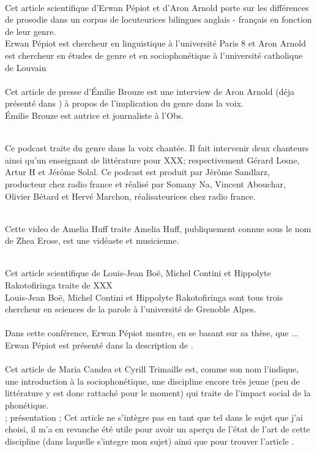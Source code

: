 \cite{Pep20} \\
      Cet article scientifique d'Erwan Pépiot et d'Aron Arnold porte sur les différences de prosodie dans un corpus de locuteurices bilingues anglais - français en fonction de leur genre.\\
      Erwan Pépiot est chercheur en linguistique à l'université Paris 8 et Aron Arnold est chercheur en études de genre et en sociophonétique à l'université catholique de Louvain \\

\cite{Bro18} \\
      Cet article de presse d'Émilie Brouze est une interview de Aron Arnold (déja présenté dans \cite{Pep20}) à propos de l'implication du genre dans la voix.\\
      Émilie Brouze est autrice et journaliste à l'Obs.

\cite{podcast} \\
      Ce podcast traite du genre dans la voix chantée. Il fait intervenir deux chanteurs ainsi qu'un enseignant de littérature pour XXX; respectivement Gérard Lesne, Artur H et Jérôme Solal.
      Ce podcast est produit par Jérôme Sandlarz, producteur chez radio france et réalisé par Somany Na, Vincent Abouchar, Olivier Bétard et Hervé Marchon, réalisateurices chez radio france.

\cite{video} \\
      Cette video de Amelia Huff traite 
      Amelia Huff, publiquement connue sous le nom de Zhea Erose, est une vidéaste et musicienne.

\cite{Boe75} \\
      Cet article scientifique de Louis-Jean Boë, Michel Contini et Hippolyte Rakotofiringa traite de XXX\\
      Louis-Jean Boë, Michel Contini et Hippolyte Rakotofiringa sont tous trois chercheur en sciences de la parole à l'université de Grenoble Alpes.\\

\cite{Pep16} \\
      Dans cette conférence, Erwan Pépiot montre, en se basant sur sa thèse, que ...\\
      Erwan Pépiot est présenté dans la description de \cite{Pep20}.\\

\cite{Can15} \\
      Cet article de Maria Candea et Cyrill Trimaille est, comme son nom l'indique, une introduction à la sociophonétique, une discipline encore très jeune (peu de littérature y est donc rattaché pour le moment) qui traite de l'impact social de la phonétique.\\
      ; présentation ;
      Cet article ne s'intègre pas en tant que tel dans le sujet que j'ai choisi, il m'a en revanche été utile pour avoir un aperçu de l'état de l'art de cette discipline (dans laquelle s'integre mon sujet) ainsi que pour trouver l'article \cite{Pep20}.\\
      
